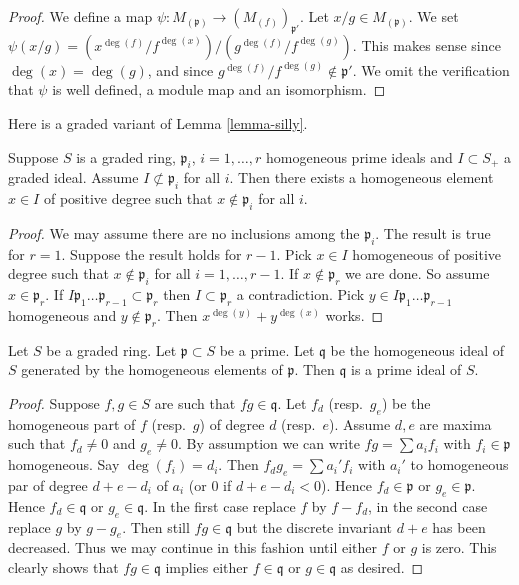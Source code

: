 \begin{proof}
We define a map $\psi : M_{(\mathfrak p)} \to (M_{(f)})_{\mathfrak p'}$.
Let $x/g \in M_{(\mathfrak p)}$. We set
$\psi(x/g) = (x^{\deg(f)}/f^{\deg(x)})/(g^{\deg(f)}/f^{\deg(g)})$.
This makes sense since $\deg(x) = \deg(g)$, and since
$g^{\deg(f)}/f^{\deg(g)} \not \in \mathfrak p'$.
We omit the verification that $\psi$ is well defined, a module map
and an isomorphism.
\end{proof}

\noindent
Here is a graded variant of Lemma \ref{lemma-silly}.

\begin{lemma}
\label{lemma-graded-silly}
Suppose $S$ is a graded ring, $\mathfrak p_i$, $i = 1, \ldots, r$
homogeneous prime ideals and $I \subset S_{+}$ a graded ideal.
Assume $I \not\subset \mathfrak p_i$ for all $i$. Then there
exists a homogeneous element $x\in I$ of positive degree such
that $x\not\in \mathfrak p_i$ for all $i$.
\end{lemma}

\begin{proof}
We may assume there are no inclusions among the $\mathfrak p_i$.
The result is true for $r = 1$. Suppose the result holds for $r - 1$.
Pick $x \in I$ homogeneous of positive degree such that
$x \not \in \mathfrak p_i$ for all $i = 1, \ldots, r - 1$.
If $x \not\in \mathfrak p_r$ we are done. So assume $x \in \mathfrak p_r$.
If $I \mathfrak p_1 \ldots \mathfrak p_{r-1} \subset \mathfrak p_r$
then $I \subset \mathfrak p_r$ a contradiction.
Pick $y \in I\mathfrak p_1 \ldots \mathfrak p_{r-1}$ homogeneous
and $y \not \in \mathfrak p_r$. Then $x^{\deg(y)} + y^{\deg(x)}$ works.
\end{proof}

\begin{lemma}
\label{lemma-smear-out}
Let $S$ be a graded ring.
Let $\mathfrak p \subset S$ be a prime.
Let $\mathfrak q$ be the homogeneous ideal of $S$ generated by the
homogeneous elements of $\mathfrak p$. Then $\mathfrak q$ is a
prime ideal of $S$.
\end{lemma}

\begin{proof}
Suppose $f, g \in S$ are such that $fg \in \mathfrak q$.
Let $f_d$ (resp.\ $g_e$) be the homogeneous part of
$f$ (resp.\ $g$) of degree $d$ (resp.\ $e$). Assume $d, e$ are
maxima such that $f_d \not = 0$ and $g_e \not = 0$.
By assumption we can write $fg = \sum a_i f_i$ with
$f_i \in \mathfrak p$ homogeneous. Say $\deg(f_i) = d_i$.
Then $f_d g_e = \sum a_i' f_i$ with $a_i'$ to homogeneous
par of degree $d + e - d_i$ of $a_i$ (or $0$ if $d + e -d_i < 0$).
Hence $f_d \in \mathfrak p$ or $g_e \in \mathfrak p$. Hence
$f_d \in \mathfrak q$ or $g_e \in \mathfrak q$. In the first
case replace $f$ by $f - f_d$, in the second case replace
$g$ by $g - g_e$. Then still $fg \in \mathfrak q$ but the discrete
invariant $d + e$ has been decreased. Thus we may continue in this
fashion until either $f$ or $g$ is zero. This clearly shows that
$fg \in \mathfrak q$ implies either $f \in \mathfrak q$ or $g \in \mathfrak q$
as desired.
\end{proof}


